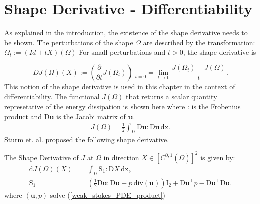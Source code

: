\section{Shape Derivative - Differentiability}\label{proof_chapter}

As explained in the introduction, the existence of the shape derivative needs to be shown.
The perturbations of the shape $\Omega$ are described by the transformation: $\Omega_t := (Id + tX )(\Omega)$ 
For small perturbations and $t > 0$, the shape derivative is \cite{fully_semi_paper_sturm}

\begin{equation}\label{shape_derrivative_t_limit}
	DJ(\Omega)(X) := \left(\frac{\partial}{\partial t}J(\Omega_t)\right)\bigg\rvert_{t=0} = \lim_{t \to 0} \frac{J(\Omega_t)-J(\Omega)}{t}.
\end{equation}
This notion of the shape derivative is used in this chapter in the context of differentiability. The functional $J(\Omega)$ that returns a scalar quantity 
represetative of the energy dissipation is shown here where : is the Frobenius product and $\mathrm{D} \mathbf{u}$ is the Jacobi matrix of $\mathbf{u}$.
\begin{align}\label{energy_dissipation_equation}
	J(\Omega) = \frac{1}{2} \int_{\Omega} \mathrm{D} \mathbf{u} : \mathrm{D} \mathbf{u} \, \mathrm{dx}.
\end{align}
Sturm et. al. \cite{nearly_conformal_paper} proposed the following shape derivative. \\
\begin{theorem*}
The Shape Derivative of $J$ at $\Omega$ in direction $ X \in [C^{0,1}(\bar{\Omega})]^2 $ is given by:
\begin{align}\label{shape_derivative_S1}
	\mathrm{d}J(\Omega)(X) &= \int_{\Omega} \mathrm{S}_1 : \mathrm{D}X \, \mathrm{dx}, \\
	\mathrm{S}_1 &= \left( \frac{1}{2}\mathrm{D} \mathbf{u} : \mathrm{D} \mathbf{u} - p \, \mathrm{div}(\mathbf{u}) \right)
	\mathrm{I}_2 + \mathrm{D} \mathbf{u}^{\top}p - \mathrm{D} \mathbf{u}^{\top} \mathrm{D} \mathbf{u}.
\end{align}
where $(\mathbf{u},p)$ solve (\ref*{weak_stokes_PDE_product})
\end{theorem*}

